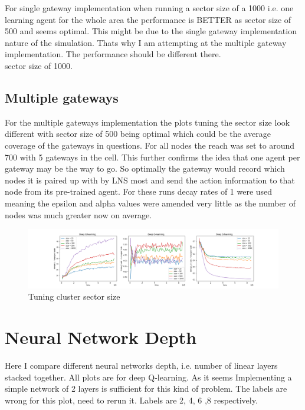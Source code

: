 For single gateway implementation when running a sector size of a 1000 i.e. one learning agent for the whole area the performance is BETTER as sector size of 500 and seems optimal. This might be due to the single gateway implementation nature of the simulation. Thats why I am attempting at the multiple  gateway implementation. The performance should be different there.\\

sector size of 1000.

\subsection{Multiple gateways}

For the multiple gateways implementation the plots tuning
the sector size look different with sector size of 500
being optimal which could be the average coverage of the 
gateways in questions. For all nodes the reach was set to around 700 with 5 gateways in the cell. This further 
confirms the idea that one agent per gateway may be 
the way to go. So optimally the gateway would record
which nodes it is paired up with by LNS most
and send the action information to that node from its
pre-trained agent. For these runs decay rates of 1 were used
meaning the epsilon and alpha values were amended very little as the number of nodes was much greater now on average.

\begin{figure}[H]
\centering
\hspace*{-3.3cm}  
\includegraphics[scale=0.40]{plots/sector_size/state_space_small.png}
  \caption{Tuning cluster sector size}
\end{figure}

\section{Neural Network Depth}

Here I compare different neural networks depth, i.e. number
of linear layers stacked together. All plots are for 
deep Q-learning. As it seems Implementing a simple 
network of 2 layers is sufficient for this kind of problem.
The labels are wrong for this plot, need to rerun it.
Labels are 2, 4, 6 ,8 respectively.

